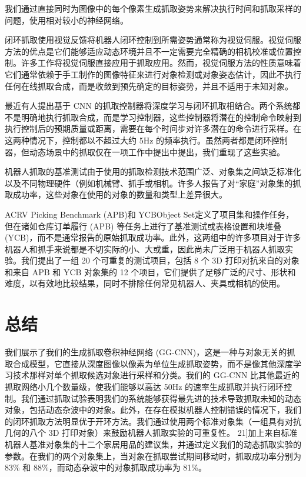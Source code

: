 我们通过直接同时为图像中的每个像素生成抓取姿势来解决执行时间和抓取采样的问题，使用相对较小的神经网络。


闭环抓取使用视觉反馈将机器人闭环控制到所需姿势通常称为视觉伺服。视觉伺服方法的优点是它们能够适应动态环境并且不一定需要完全精确的相机校准或位置控制。许多工作将视觉伺服直接应用于抓取应用。然而，视觉伺服方法的性质意味着它们通常依赖于手工制作的图像特征来进行对象检测或对象姿态估计，因此不执行任何在线抓取合成，而是收敛到预先确定的目标姿势，并且不适用于未知对象。


最近有人提出基于 CNN 的抓取控制器将深度学习与闭环抓取相结合。两个系统都不是明确地执行抓取合成，而是学习控制器，这些控制器将潜在的控制命令映射到执行控制后的预期质量或距离，需要在每个时间步对许多潜在的命令进行采样。在这两种情况下，控制都以不超过大约 5Hz 的频率执行。虽然两者都是闭环控制器，但动态场景中的抓取仅在一项工作中提出中提出，我们重现了这些实验。


机器人抓取的基准测试由于使用的抓取检测技术范围广泛、对象集之间缺乏标准化以及不同物理硬件（例如机械臂、抓手或相机。许多人报告了对“家庭”对象集的抓取成功率，这些对象在使用的对象的数量和类型上差异很大。

ACRV Picking Benchmark (APB)和 YCBObject Set定义了项目集和操作任务，但在诸如仓库订单履行 (APB) 等任务上进行了基准测试或表格设置和块堆叠 (YCB)，而不是通常报告的原始抓取成功率。此外，这两组中的许多项目对于许多机器人和抓手来说都是不切实际的小、大或重，因此尚未广泛用于机器人抓取实验。我们提出了一组 20 个可重复的测试项目，包括 8 个 3D 打印对抗来自的对象和来自 APB 和 YCB 对象集的 12 个项目，它们提供了足够广泛的尺寸、形状和难度，以有效地比较结果，同时不排除任何常见机器人、夹具或相机的使用。

\section{总结}
我们展示了我们的生成抓取卷积神经网络 (GG-CNN)，这是一种与对象无关的抓取合成模型，它直接从深度图像以像素为单位生成抓取姿势，而不是像其他深度学习技术那样对单个抓取候选对象进行采样和分类。我们的 GG-CNN 比其他最近的抓取网络小几个数量级，使我们能够以高达 50Hz 的速率生成抓取并执行闭环控制。我们通过抓取试验表明我们的系统能够获得最先进的技术导致抓取未知的动态对象，包括动态杂波中的对象。此外，在存在模拟机器人控制错误的情况下，我们的闭环抓取方法明显优于开环方法。我们通过使用两个标准对象集（一组具有对抗几何的八个 3D 打印对象）来鼓励机器人抓取实验的可重复性。 21]加上来自标准机器人基准对象集的十二个家居用品的建议集，并通过定义我们的动态抓取实验的参数。在我们的两个对象集上，当对象在抓取尝试期间移动时，抓取成功率分别为 83\% 和 88\%，而动态杂波中的对象抓取成功率为 81\%。